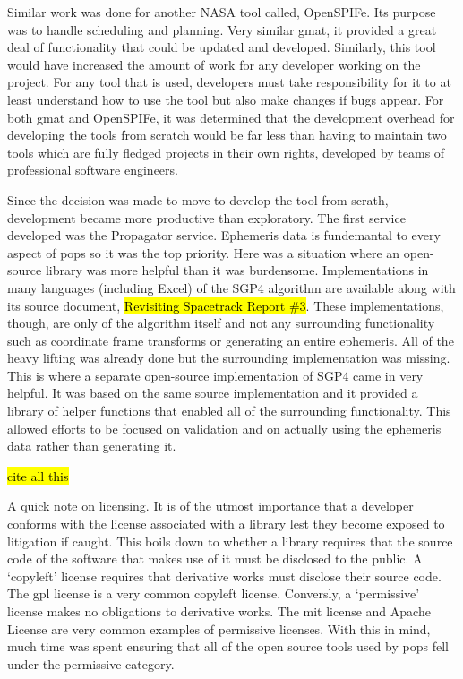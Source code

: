 
Similar work was done for another NASA tool called, OpenSPIFe. Its purpose was
to handle scheduling and planning. Very similar \gls{gmat}, it provided a great
deal of functionality that could be updated and developed. Similarly, this tool
would have increased the amount of work for any developer working on the
project. For any tool that is used, developers must take responsibility for it
to at least understand how to use the tool but also make changes if bugs
appear. For both \gls{gmat} and OpenSPIFe, it was determined that the
development overhead for developing the tools from scratch would be far less
than having to maintain two tools which are fully fledged projects in their own
rights, developed by teams of professional software engineers.

Since the decision was made to move to develop the tool from scrath,
development became more productive than exploratory. The first service
developed was the Propagator service. Ephemeris data is fundemantal to every
aspect of \gls{pops} so it was the top priority. Here was a situation where an
open-source library was more helpful than it was burdensome. Implementations in
many languages (including Excel) of the SGP4 algorithm are available along with
its source document, \hl{Revisiting Spacetrack Report \#3}. These
implementations, though, are only of the algorithm itself and not any
surrounding functionality such as coordinate frame transforms or generating an
entire ephemeris. All of the heavy lifting was already done but the surrounding
implementation was missing. This is where a separate open-source implementation
of SGP4 came in very helpful. It was based on the same source implementation
and it provided a library of helper functions that enabled all of the
surrounding functionality. This allowed efforts to be focused on validation and
on actually using the ephemeris data rather than generating it.

\hl{cite all this}

A quick note on licensing. It is of the utmost importance that a developer
conforms with the license associated with a library lest they become exposed to
litigation if caught. This boils down to whether a library requires that the
source code of the software that makes use of it must be disclosed to the
public. A `copyleft' license requires that derivative works must disclose their
source code. The \gls{gpl} license is a very common copyleft license.
Conversly, a `permissive' license makes no obligations to derivative works. The
\gls{mit} license and Apache License are very common examples of permissive
licenses. With this in mind, much time was spent ensuring that all of the open
source tools used by \gls{pops} fell under the permissive category.  

